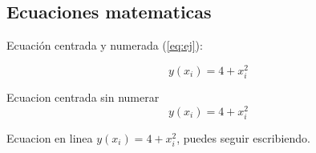 \subsection{Ecuaciones matematicas}

Ecuación centrada y numerada (\ref{eq:ej}):

\begin{equation}\label{eq:ej}
y(x_{i}) = 4 + x_{i}^{2}
\end{equation}

Ecuacion centrada sin numerar 
$$ y(x_{i}) = 4 + x_{i}^{2} $$

Ecuacion en linea $y(x_{i}) = 4 + x_{i}^{2}$, puedes seguir escribiendo.


